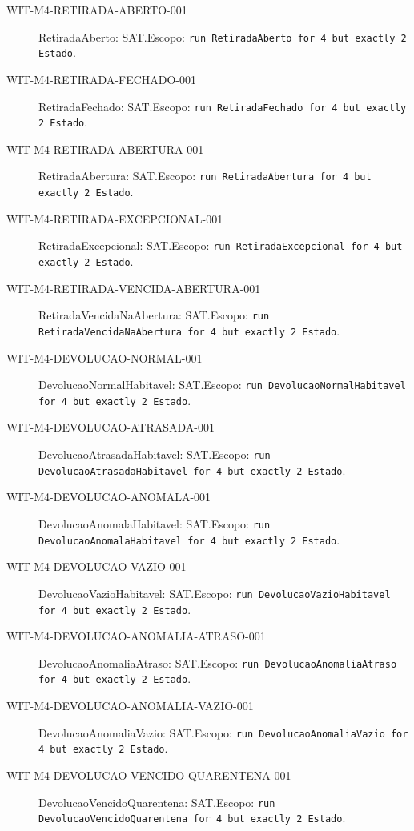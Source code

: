 \begin{description}
\item[WIT-M4-RETIRADA-ABERTO-001] RetiradaAberto: SAT.\newline Escopo: \texttt{run RetiradaAberto for 4 but exactly 2 Estado}.
\item[WIT-M4-RETIRADA-FECHADO-001] RetiradaFechado: SAT.\newline Escopo: \texttt{run RetiradaFechado for 4 but exactly 2 Estado}.
\item[WIT-M4-RETIRADA-ABERTURA-001] RetiradaAbertura: SAT.\newline Escopo: \texttt{run RetiradaAbertura for 4 but exactly 2 Estado}.
\item[WIT-M4-RETIRADA-EXCEPCIONAL-001] RetiradaExcepcional: SAT.\newline Escopo: \texttt{run RetiradaExcepcional for 4 but exactly 2 Estado}.
\item[WIT-M4-RETIRADA-VENCIDA-ABERTURA-001] RetiradaVencidaNaAbertura: SAT.\newline Escopo: \texttt{run RetiradaVencidaNaAbertura for 4 but exactly 2 Estado}.
\item[WIT-M4-DEVOLUCAO-NORMAL-001] DevolucaoNormalHabitavel: SAT.\newline Escopo: \texttt{run DevolucaoNormalHabitavel for 4 but exactly 2 Estado}.
\item[WIT-M4-DEVOLUCAO-ATRASADA-001] DevolucaoAtrasadaHabitavel: SAT.\newline Escopo: \texttt{run DevolucaoAtrasadaHabitavel for 4 but exactly 2 Estado}.
\item[WIT-M4-DEVOLUCAO-ANOMALA-001] DevolucaoAnomalaHabitavel: SAT.\newline Escopo: \texttt{run DevolucaoAnomalaHabitavel for 4 but exactly 2 Estado}.
\item[WIT-M4-DEVOLUCAO-VAZIO-001] DevolucaoVazioHabitavel: SAT.\newline Escopo: \texttt{run DevolucaoVazioHabitavel for 4 but exactly 2 Estado}.
\item[WIT-M4-DEVOLUCAO-ANOMALIA-ATRASO-001] DevolucaoAnomaliaAtraso: SAT.\newline Escopo: \texttt{run DevolucaoAnomaliaAtraso for 4 but exactly 2 Estado}.
\item[WIT-M4-DEVOLUCAO-ANOMALIA-VAZIO-001] DevolucaoAnomaliaVazio: SAT.\newline Escopo: \texttt{run DevolucaoAnomaliaVazio for 4 but exactly 2 Estado}.
\item[WIT-M4-DEVOLUCAO-VENCIDO-QUARENTENA-001] DevolucaoVencidoQuarentena: SAT.\newline Escopo: \texttt{run DevolucaoVencidoQuarentena for 4 but exactly 2 Estado}.

\end{description}
